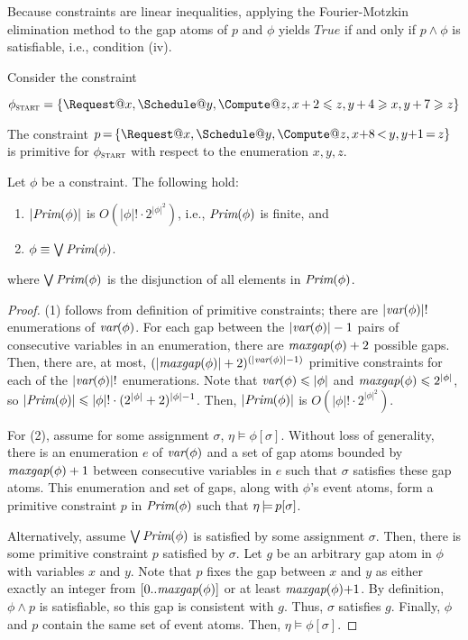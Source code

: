 Because constraints are linear inequalities,
applying the Fourier-Motzkin elimination method \cite{dantzig1972fourier}
to the gap atoms of $p$ and $\phi$ yields $True$
if and only if $p \land \phi$ is satisfiable, i.e., condition (iv).

\begin{examp}\label{ex:start}
  Consider the constraint

  $
    \phi_{\textsc{start}}=\{
    \Request@x,
    \Schedule@y,
    \Compute@z,
    x \tight+2\leq z,
    y \tight+4\geq x,
    y \tight+7\geq z
    \}
  $
   
  \noindent The constraint $p\tight=\{\Request@x, \Schedule@y, \Compute@z,
  x{+}8\tight<y,y{+}1\tight=z\}$
  is primitive for $\phi_{\textsc{start}}$
  with respect to the enumeration $x, y, z$.
\end{examp}

\begin{lemma}\label{lem:primitive}
  Let $\phi$ be a constraint. The following hold:
  \begin{enumerate}
  \item
    $|\textit{Prim}(\phi)|$ is $O(|\phi|!\cdot 2^{|\phi|^{2}})$, i.e., $\textit{Prim}(\phi)$ is finite, and
  \item
    $\phi\equiv\bigvee\textit{Prim}(\phi)$.
  \end{enumerate}
  where $\bigvee\textit{Prim}(\phi)$ is the disjunction
  of all elements in $\textit{Prim}(\phi)$.
\end{lemma}

\begin{proof}
(1) follows from definition of primitive constraints;
there are $|\textit{var}(\phi)|!$ enumerations of $\textit{var}(\phi)$.
For each gap between the $|\textit{var}(\phi)|-1$ pairs of consecutive variables in an enumeration,
there are $\textit{maxgap}(\phi)+2$ possible gaps.
Then, there are, at most, $(|\textit{maxgap}(\phi)|+2)^{(|\textit{var}(\phi)|-1)}$ primitive constraints
for each of the $|\textit{var}(\phi)|!$ enumerations.
Note that
$\textit{var}(\phi) \leqslant |\phi|$
and
$\textit{maxgap}(\phi) \leqslant 2^{|\phi|}$,
so
$|\textit{Prim}(\phi)|\leqslant |\phi|!\cdot (2^{|\phi|}+2)^{|\phi|-1}$.
Then, $|\textit{Prim}(\phi)|$ is $O(|\phi|!\cdot 2^{|\phi|^{2}})$.

For (2),
assume for some assignment $\sigma$,
$\eta\models\phi[\sigma]$.
Without loss of generality,
there is an enumeration $e$ of $\textit{var}(\phi)$
and a set of gap atoms bounded by $\textit{maxgap}(\phi)+1$ between consecutive variables
in $e$ such that $\sigma$ satisfies these gap atoms.
This enumeration and set of gaps,
along with $\phi$'s event atoms,
form a primitive constraint $p$ in $\textit{Prim}(\phi)$
such that $\eta\,{\models}\, p[\sigma]$.

Alternatively,
assume $\bigvee\textit{Prim}(\phi)$ is satisfied by some assignment $\sigma$.
Then,
there is some primitive constraint $p$ 
satisfied by $\sigma$.
Let $g$ be an arbitrary gap atom in $\phi$ with variables $x$ and $y$.
Note that $p$ fixes the gap between $x$ and $y$
as either exactly an integer from $[0..\textit{maxgap}(\phi)]$
or at least $\textit{maxgap}(\phi){+}1$.
By definition,
$\phi\wedge p$ is satisfiable,
so this gap is consistent with $g$.
Thus, $\sigma$ satisfies $g$.
Finally, 
$\phi$ and $p$ contain the same set of event atoms.
Then,
$\eta\models\phi[\sigma]$.
\end{proof}


